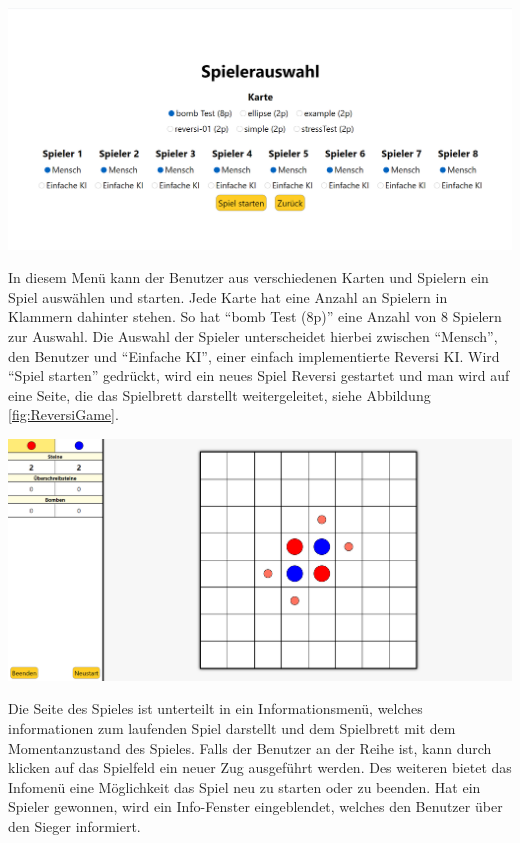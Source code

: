 \documentclass[12pt,a4paper,bibliography=totocnumbered,listof=totocnumbered]{article}
\begin{document}
\vspace{1em}
\begin{minipage}{\linewidth}
	\centering
	\includegraphics[width=0.7\linewidth]{pics/ReversiGameSelection.png}
	\label{fig:ReversiGameSelection}
\end{minipage}

In diesem Menü kann der Benutzer aus verschiedenen Karten und Spielern ein Spiel auswählen und starten. Jede Karte hat eine Anzahl an Spielern 
in Klammern dahinter stehen. So hat ``bomb Test (8p)'' eine Anzahl von 8 Spielern zur Auswahl. Die Auswahl der Spieler unterscheidet hierbei
zwischen ``Mensch'', den Benutzer und ``Einfache KI'', einer einfach implementierte Reversi KI. Wird ``Spiel starten'' gedrückt, wird
ein neues Spiel Reversi gestartet und man wird auf eine Seite, die das Spielbrett darstellt weitergeleitet, siehe Abbildung \ref{fig:ReversiGame}.

\vspace{1em}
\begin{minipage}{\linewidth}
	\centering
	\includegraphics[width=0.7\linewidth]{pics/ReversiGame.png}
	\label{fig:ReversiGame}
\end{minipage}

Die Seite des Spieles ist unterteilt in ein Informationsmenü, welches informationen zum laufenden Spiel darstellt und dem Spielbrett mit dem
Momentanzustand des Spieles. Falls der Benutzer an der Reihe ist, kann durch klicken auf das Spielfeld ein neuer Zug ausgeführt werden.
Des weiteren bietet das Infomenü eine Möglichkeit das Spiel neu zu starten oder zu beenden. 
Hat ein Spieler gewonnen, wird ein Info-Fenster eingeblendet, welches den Benutzer über den Sieger informiert.
\end{document}
